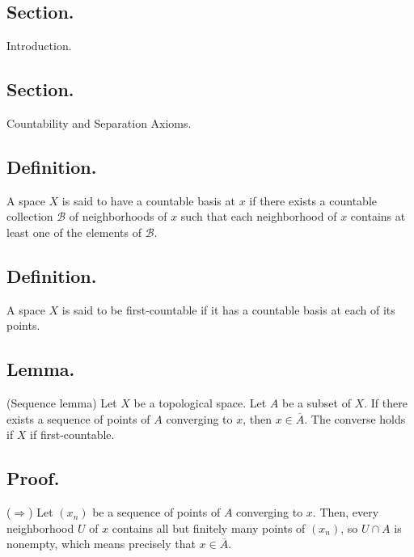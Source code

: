 \documentclass[titlepage]{article}
\begin{document}
\maketitle

\tableofcontents

\newpage {}

\subsection{Section.} Introduction.

\newpage {}

\subsection{Section.} Countability and Separation Axioms.

\subsection{Definition.} A space $X$ is said to have a countable basis at $x$ if there exists a countable collection $\mathcal{B}$ of neighborhoods of $x$ such that each neighborhood of $x$ contains at least one of the elements of $\mathcal{B}$.

\subsection{Definition.} A space $X$ is said to be first-countable if it has a countable basis at each of its points.

\subsection{Lemma.} (Sequence lemma) Let $X$ be a topological space. Let $A$ be a subset of $X$. If there exists a sequence of points of $A$ converging to $x$, then $x \in \overline{A}$. The converse holds if $X$ if first-countable.

\subsection{Proof.}

($\Rightarrow$) Let $(x_{n})$ be a sequence of points of $A$ converging to $x$. Then, every neighborhood $U$ of $x$ contains all but finitely many points of $(x_{n})$, so $U \cap A$ is nonempty, which means precisely that $x \in \overline{A}$.
\end{document}
